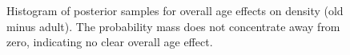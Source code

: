 \documentclass[
  letterpaper,
  DIV=11,
  numbers=noendperiod,
  oneside]{scrartcl}
\theoremstyle{plain}
\theoremstyle{remark}
\begin{document}
\begin{figure}


\caption{\label{fig-density-mu}Histogram of posterior samples for
overall age effects on density (old minus adult). The probability mass
does not concentrate away from zero, indicating no clear overall age
effect.}

\end{figure}%
\end{document}
